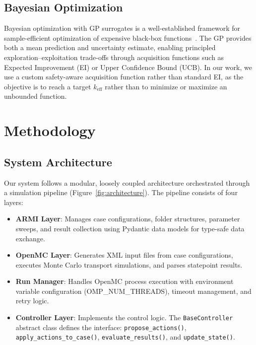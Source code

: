 \documentclass[11pt,twocolumn]{article}
\begin{document}
\subsection{Bayesian Optimization}

Bayesian optimization with GP surrogates is a well-established framework for sample-efficient optimization of expensive black-box functions~\cite{shahriari2016taking,snoek2012practical}.
The GP provides both a mean prediction and uncertainty estimate, enabling principled exploration--exploitation trade-offs through acquisition functions such as Expected Improvement (EI) or Upper Confidence Bound (UCB).
In our work, we use a custom safety-aware acquisition function rather than standard EI, as the objective is to reach a target $k_\text{eff}$ rather than to minimize or maximize an unbounded function.

\section{Methodology}
\label{sec:methodology}

\subsection{System Architecture}

Our system follows a modular, loosely coupled architecture orchestrated through a simulation pipeline (Figure~\ref{fig:architecture}).
The pipeline consists of four layers:

\begin{itemize}
    \item \textbf{ARMI Layer}: Manages case configurations, folder structures, parameter sweeps, and result collection using Pydantic data models for type-safe data exchange.
    \item \textbf{OpenMC Layer}: Generates XML input files from case configurations, executes Monte Carlo transport simulations, and parses statepoint results.
    \item \textbf{Run Manager}: Handles OpenMC process execution with environment variable configuration (OMP\_NUM\_THREADS), timeout management, and retry logic.
    \item \textbf{Controller Layer}: Implements the control logic. The \texttt{BaseController} abstract class defines the interface: \texttt{propose\_actions()}, \texttt{apply\_actions\_to\_case()}, \texttt{evaluate\_results()}, and \texttt{update\_state()}.
\end{itemize}
\end{document}
